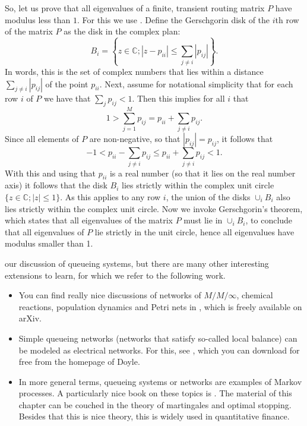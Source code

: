 So, let us prove that all eigenvalues of a finite, transient routing matrix $P$ have modulus less than $1$.
For this we use .
Define the Gerschgorin disk of the $i$th row of the matrix $P$ as the disk in the complex plan:
\begin{equation*}
B_i=\left\{z\in \mathbb{C};  |z-p_{ii}|\leq \sum_{j\neq i} |p_{i j}| \right\}.  
\end{equation*}
In words, this is the set of complex numbers that lies within a distance $\sum_{j\neq i} |p_{i j}|$ of the point $p_{i i}$.
Next, assume for notational simplicity that for each row $i$ of $P$ we have that $\sum_{j} p_{i j}<1$.
Then this implies for all $i$ that
\begin{equation*}
1> \sum_{j=1}^M p_{i j} =  p_{ii} + \sum_{j\neq i} p_{i j}.
\end{equation*}
Since all elements of $P$ are non-negative, so that $|p_{i j}| = p_{i j }$, it follows that
\begin{equation*}
-1 < p_{ii} - \sum_{j\neq i} p_{i j} \leq p_{ii} + \sum_{j\neq i} p_{i j} < 1. 
\end{equation*}
With this and using that $p_{ii}$ is a real number (so that it lies on the real number axis) it follows that the disk $B_i $ lies strictly within the complex unit circle $\{z \in \mathbb{C}; |z|\leq 1\}$.
As this applies to any row $i$, the union of the disks $\cup_{i} B_{i}$ also lies strictly within the complex unit circle.
Now we invoke Gerschgorin's theorem, which states that all eigenvalues of the matrix $P$ must lie in $\cup_i B_i$, to conclude that all eigenvalues of $P$ lie strictly in the unit circle, hence all eigenvalues have modulus smaller than 1.


 our discussion of queueing systems, but there are many other interesting extensions to learn, for which we refer to the following work.
\begin{itemize}
\item You can find really nice discussions of networks of $M/M/\infty$, chemical reactions, population dynamics and Petri nets in \cite{baez2012quantum}, which is freely available on arXiv.
\item Simple queueing networks (networks that satisfy so-called local balance) can be modeled as electrical networks.
  For this, see \cite{doyle84:_random_walks_elect_networ}, which you can download for free from the homepage of Doyle.
\item In more general terms, queueing systems or networks are examples of Markov processes.
  A particularly nice book on these topics is \cite{norris97:_markov_chain}.
  The material of this chapter can be couched in the theory of martingales and optimal stopping.
  Besides that this is nice theory, this is widely used in quantitative finance.
\end{itemize}


